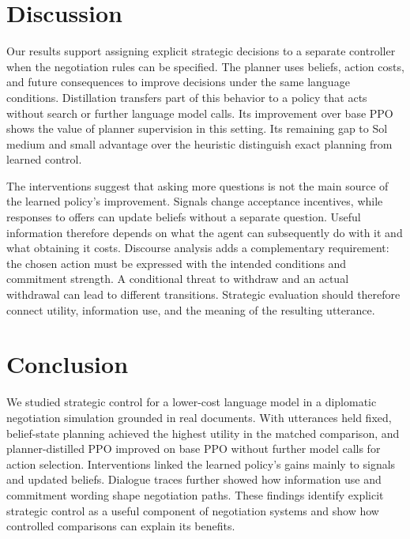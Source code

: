 \section{Discussion}
Our results support assigning explicit strategic decisions to a separate controller when the negotiation rules can be specified. The planner uses beliefs, action costs, and future consequences to improve decisions under the same language conditions. Distillation transfers part of this behavior to a policy that acts without search or further language model calls. Its improvement over base PPO shows the value of planner supervision in this setting. Its remaining gap to Sol medium and small advantage over the heuristic distinguish exact planning from learned control.

The interventions suggest that asking more questions is not the main source of the learned policy's improvement. Signals change acceptance incentives, while responses to offers can update beliefs without a separate question. Useful information therefore depends on what the agent can subsequently do with it and what obtaining it costs. Discourse analysis adds a complementary requirement: the chosen action must be expressed with the intended conditions and commitment strength. A conditional threat to withdraw and an actual withdrawal can lead to different transitions. Strategic evaluation should therefore connect utility, information use, and the meaning of the resulting utterance.

\section{Conclusion}
We studied strategic control for a lower-cost language model in a diplomatic negotiation simulation grounded in real documents. With utterances held fixed, belief-state planning achieved the highest utility in the matched comparison, and planner-distilled PPO improved on base PPO without further model calls for action selection. Interventions linked the learned policy's gains mainly to signals and updated beliefs. Dialogue traces further showed how information use and commitment wording shape negotiation paths. These findings identify explicit strategic control as a useful component of negotiation systems and show how controlled comparisons can explain its benefits.
